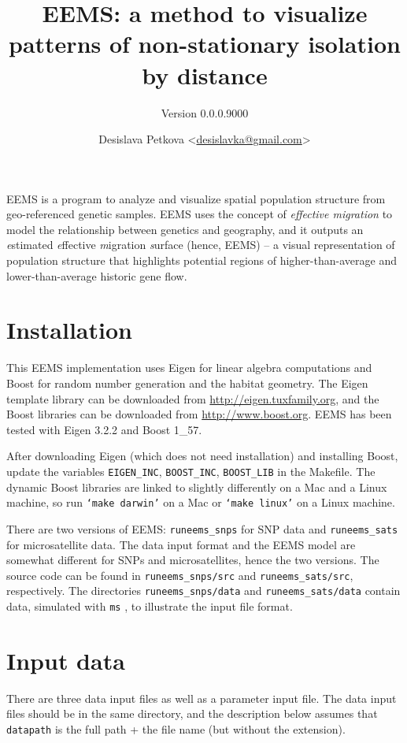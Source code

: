 \documentclass[a4paper,10pt,DIV=15,titlepage,mpinclude=true]{scrartcl}
\title{EEMS: a method to visualize patterns of non-stationary isolation by distance}
\subtitle{Version 0.0.0.9000}
\author{Desislava Petkova <\href{mailto:desislavka@gmail.com}{desislavka@gmail.com}>}
\newcommand{\keystring}[1]{{\tt #1}}
\begin{document}
\maketitle
\tableofcontents
\listoffigures
\clearpage


EEMS is a program to analyze and visualize spatial population structure from geo-referenced genetic samples. EEMS uses the concept of \textit{effective migration} to model the relationship between genetics and geography, and it outputs an \textit{e}stimated \textit{e}ffective \textit{m}igration \textit{s}urface (hence, EEMS) -- a visual representation of population structure that highlights potential regions of higher-than-average and lower-than-average historic gene flow.

\section{Installation}

This EEMS implementation uses Eigen for linear algebra computations and Boost for random number generation and the habitat geometry. The Eigen template library can be downloaded from \url{http://eigen.tuxfamily.org}, and the Boost libraries can be downloaded from \url{http://www.boost.org}. EEMS has been tested with Eigen 3.2.2 and Boost 1\_57.

After downloading Eigen (which does not need installation) and installing Boost, update the variables {\tt EIGEN\_INC}, {\tt BOOST\_INC}, {\tt BOOST\_LIB} in the Makefile. The dynamic Boost libraries are linked to slightly differently on a Mac and a Linux machine, so run \keystring{`make darwin'} on a Mac or \keystring{`make linux'} on a Linux machine.

There are two versions of EEMS: \keystring{runeems\_snps} for SNP data and \keystring{runeems\_sats} for microsatellite data. The data input format and the EEMS model are somewhat different for SNPs and microsatellites, hence the two versions. The source code can be found in \keystring{runeems\_snps/src} and \keystring{runeems\_sats/src}, respectively. The directories \keystring{runeems\_snps/data} and \keystring{runeems\_sats/data} contain data, simulated with \keystring{ms} \cite{Hudson:2002fk}, to illustrate the input file format.

\section{Input data}

There are three data input files as well as a parameter input file. The data input files should be in the same directory, and the description below assumes that \keystring{datapath} is the full path + the file name (but without the extension).
\end{document}
